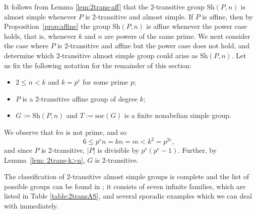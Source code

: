 \documentclass[12pt]{amsart}
\theoremstyle{remark}
\theoremstyle{definition}
\newcommand{\soc}{\mathrm{soc}}
\newcommand{\sym}{\mathrm{Sym}}
\newcommand{\sh}{\mathrm{Sh}}
\begin{document}
It follows from Lemma \ref{lem:2trans-aff} that the $2$-transitive group $\sh(P,n)$ is almost simple whenever $P$ is $2$-transitive and almost simple. If $P$ is affine, then by Proposition~\ref{prop:affine} the group $\sh(P,n)$ is affine whenever the power case holds, that is, whenever $k$ and $ n$ are powers of the same prime. We next consider the case where $P$ is $2$-transitive and affine but the power case does not hold, and determine which $2$-transitive almost simple group could arise as $\sh(P,n)$. Let us fix the following notation for the remainder of this section:
\begin{itemize}
\item $2 \leqslant n < k$ and $k=p^e$ for some prime $p$;
\item $P$ is a 2-transitive affine group of degree $k$;
\item $G := \sh(P,n)$ and $T:=\mathrm{soc}(G)$ is a finite nonabelian simple group.
\end{itemize}
We observe that  $kn$ is not prime, and so
	\begin{equation} \label{eq:kn}
	6 \leqslant p^e n = kn = m < k^2 = p^{2e},
	\end{equation}
and since $P$ is $2$-transitive, $|P|$ is divisible by $p^e(p^e-1)$. Further, by Lemma~\ref{lem: 2trans-k>n}, $G$ is 2-transitive. 


The classification of $2$-transitive almost simple groups is complete and the list of possible groups can be found in \cite[Table 7.4]{cameronpermgroups}; it consists of seven infinite families, which are listed in Table \ref{table:2transAS}, and several sporadic examples which we can deal with immediately.
\end{document}

